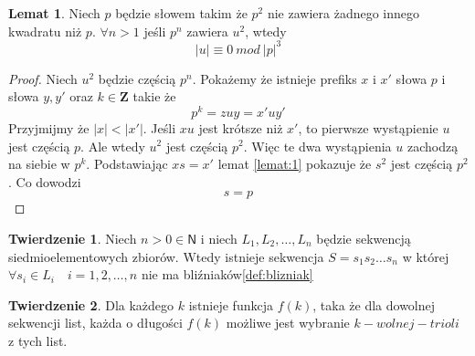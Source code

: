 \documentclass[11pt,a4paper]{article}
\theoremstyle{definition}
\newtheorem{theorem}{Twierdzenie}[section]
\newtheorem{lemma}{Lemat}[section]
\begin{document}
\begin{lemma}\label{lemat:2}
Niech $p$ będzie słowem takim że $p^2$ nie zawiera żadnego innego kwadratu niż $p$.
$\forall n > 1$ jeśli
$p^n$ zawiera $u^2$, wtedy $$|u| \equiv 0 ~mod~ |p|^3$$
\begin{proof}
Niech $u^2$ będzie częścią $p^n$. Pokażemy że istnieje prefiks $x$ i $x'$
słowa $p$ i słowa $y,y'$ oraz $k \in \mathbf{Z}$ takie że
$$p^k = zuy = x'uy'$$
Przyjmijmy że $|x| < |x'|$. Jeśli $xu$ jest krótsze niż $x'$, to pierwsze wystąpienie
$u$ jest częścią $p$. Ale wtedy $u^2$ jest częścią $p^2$. Więc te dwa wystąpienia $u$
zachodzą na siebie w $p^k$.
Podstawiając $xs = x'$ lemat \ref{lemat:1} pokazuje że $s^2$ jest częścią $p^2$.
Co dowodzi
$$ s = p $$
\end{proof}
\end{lemma}

\begin{theorem}
Niech $n > 0 \in \mathsf{N}$ i
niech $L_1,L_2,\ldots,L_n$ będzie sekwencją
siedmioelementowych zbiorów. Wtedy istnieje sekwencja $S=s_1s_2\ldots s_n$ w której
$\forall s_i \in L_i \quad i = 1,2,\ldots,n$ nie ma bliźniaków\ref{def:blizniak}
\end{theorem}

\begin{theorem}
Dla każdego $k$ istnieje funkcja $f(k)$, taka że
dla dowolnej sekwencji list, każda o długości $f(k)$
możliwe jest wybranie $k-wolnej-trioli$ z tych list.
\end{theorem}
\end{document}
